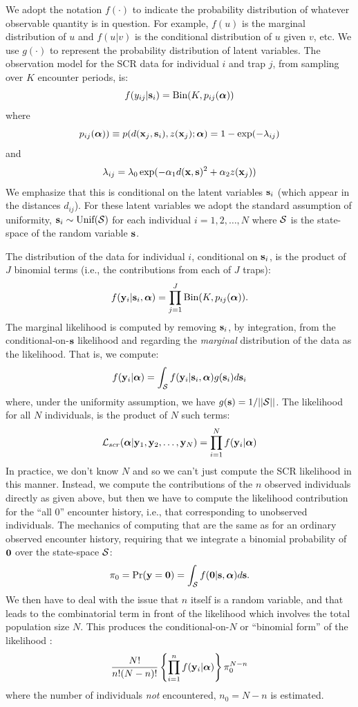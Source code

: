\documentclass[12pt]{article}
\begin{document}
We adopt the notation $f(\cdot)$ to indicate the probability
distribution of whatever observable quantity is in question.
For example, $f(u)$ is
the marginal distribution of $u$ and $f(u|v)$ is the conditional
distribution of $u$ given $v$, etc. We use $g(\cdot)$ to represent the
probability distribution of latent variables.
The observation model for the SCR data for individual $i$ and trap $j$,
from sampling over $K$ encounter periods, is:
\begin{equation}
f(y_{ij}| {\bf s}_{i}) = \mbox{Bin}(K, p_{ij}({\bm \alpha}))
\label{rsf.mle.eq.cond-on-s}
\end{equation}
where
\[
p_{ij}({\bm \alpha})) \equiv  p(d({\bf x}_{j},{\bf s}_{i}), z({\bf x}_{j}); {\bm \alpha})
 = 1-\exp(- \lambda_{ij} )
\]
and
\[
 \lambda_{ij} = \lambda_{0} \exp(- \alpha_{1}
d({\bf x},{\bf s})^{2}
 + \alpha_{2} z({\bf x}_{j}) )
\]
We emphasize that this is conditional on the latent variables ${\bf
  s}_{i}$ (which appear in the distances $d_{ij}$). For these latent variables we
adopt the standard assumption of uniformity, ${\bf s}_{i} \sim
\mbox{Unif}({\cal S})$ for each individual $i=1,2,\ldots,N$
\citep{royle_young:2008} where ${\cal S}$ is the state-space of the
random variable ${\bf s}$.

The distribution of the data for
individual $i$, conditional on ${\bf s}_{i}$, is the product of $J$
binomial terms (i.e., the contributions from each of $J$ traps):
\[
  f({\bf y}_{i} | {\bf s}_{i} , {\bm \alpha}) =
  \prod_{j=1}^{J} \mbox{Bin}(K, p_{ij} ( {\bm \alpha})).
\]
The marginal likelihood \citep{borchers_efford:2008} is
computed by removing ${\bf s}_{i}$, by integration, from the
conditional-on-${\bf s}$ likelihood and regarding the {\it marginal}
distribution of the data as the likelihood. That is, we compute:
\[
  f({\bf y}_{i}|{\bm \alpha}) =
\int_{{\cal S}}  f( {\bf y}_{i} |{\bf s}_{i},{\bm \alpha}) g({\bf s}_{i}) d{\bf s}_{i}
\]
 where, under the uniformity assumption, we have
$g({\bf s}) = 1/||{\cal S}||$.
The likelihood for all $N$ individuals,
is the product of $N$ such terms:
\[
{\cal L}_{scr}({\bm \alpha} | {\bf y}_{1},{\bf y}_{2},\ldots, {\bf y}_{N}) = \prod_{i=1}^{N}
f({\bf y}_{i}|{\bm \alpha})
\]
In practice, we don't know $N$ and so we can't just compute the SCR
likelihood in this manner. Instead, we compute the contributions of
the $n$ observed individuals
directly as given above, but then we have
to compute the likelihood contribution for the ``all 0'' encounter
history, i.e., that corresponding to unobserved individuals.  The
mechanics of computing that are the same as for an ordinary observed
encounter history, requiring that we integrate a binomial probability
of ${\bf 0}$ over the state-space ${\cal S}$:
\[
\pi_{0} = \Pr({\bf y} = {\bf 0}) = \int_{{\cal S}}
  f({\bf 0} | {\bf s} , {\bm \alpha})  d{\bf s}.
\]
We
then have to deal with the issue that $n$
itself is a random variable,
and that leads to the combinatorial term in front of the likelihood
which involves the total population size $N$. This produces the
conditional-on-$N$ or ``binomial form'' of the likelihood
\citep{borchers_efford:2008,royle:2009}:
\[
\frac{N!}{n! (N-n)!}
\left\{ \prod_{i=1}^{n} f({\bf y}_{i}|{\bm \alpha}) \right\}
\pi_{0}^{N-n}
\]
where the number of individuals {\it not} encountered, $n_{0} = N-n$
is estimated.
\end{document}
